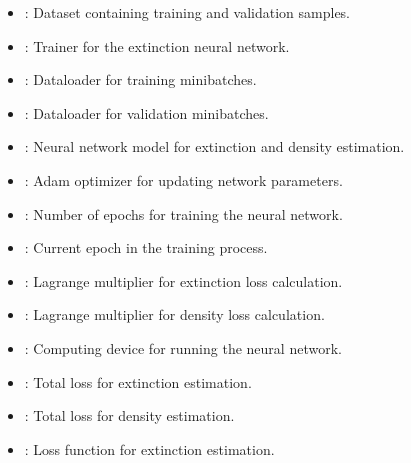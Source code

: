 \documentclass[letterpaper,10pt,english]{sphinxmanual}
\begin{document}
\begin{fulllineitems}
\begin{description}
\begin{itemize}
\item {} 
\sphinxAtStartPar
{}: Dataset containing training and validation samples.

\item {} 
\sphinxAtStartPar
{}: Trainer for the extinction neural network.

\item {} 
\sphinxAtStartPar
{}: Dataloader for training minibatches.

\item {} 
\sphinxAtStartPar
{}: Dataloader for validation minibatches.

\item {} 
\sphinxAtStartPar
{}: Neural network model for extinction and density estimation.

\item {} 
\sphinxAtStartPar
{}: Adam optimizer for updating network parameters.

\item {} 
\sphinxAtStartPar
{}: Number of epochs for training the neural network.

\item {} 
\sphinxAtStartPar
{}: Current epoch in the training process.

\item {} 
\sphinxAtStartPar
{}: Lagrange multiplier for extinction loss calculation.

\item {} 
\sphinxAtStartPar
{}: Lagrange multiplier for density loss calculation.

\item {} 
\sphinxAtStartPar
{}: Computing device for running the neural network.

\item {} 
\sphinxAtStartPar
{}: Total loss for extinction estimation.

\item {} 
\sphinxAtStartPar
{}: Total loss for density estimation.

\item {} 
\sphinxAtStartPar
{}: Loss function for extinction estimation.


\end{itemize}
\end{description}
\end{fulllineitems}
\end{document}

